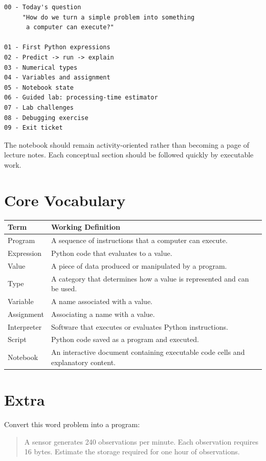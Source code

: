 \documentclass[11pt]{article}
\begin{document}
\begin{verbatim}
00 - Today's question
     "How do we turn a simple problem into something
      a computer can execute?"

01 - First Python expressions
02 - Predict -> run -> explain
03 - Numerical types
04 - Variables and assignment
05 - Notebook state
06 - Guided lab: processing-time estimator
07 - Lab challenges
08 - Debugging exercise
09 - Exit ticket
\end{verbatim}

The notebook should remain activity-oriented rather than becoming a page of lecture notes. Each conceptual section should be followed quickly by executable work.

\section*{Core Vocabulary}

\begin{longtable}{p{1.4in} p{4.9in}}
\toprule
\textbf{Term} & \textbf{Working Definition} \\
\midrule
Program & A sequence of instructions that a computer can execute. \\
Expression & Python code that evaluates to a value. \\
Value & A piece of data produced or manipulated by a program. \\
Type & A category that determines how a value is represented and can be used. \\
Variable & A name associated with a value. \\
Assignment & Associating a name with a value. \\
Interpreter & Software that executes or evaluates Python instructions. \\
Script & Python code saved as a program and executed. \\
Notebook & An interactive document containing executable code cells and explanatory content. \\
\bottomrule
\end{longtable}

\section*{Extra}

Convert this word problem into a program:

\begin{quote}
A sensor generates 240 observations per minute. Each observation requires 16 bytes. Estimate the storage required for one hour of observations.
\end{quote}
\end{document}
